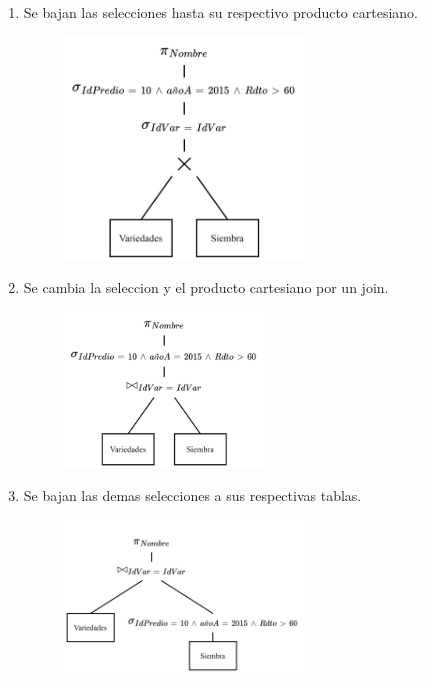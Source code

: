 \documentclass{templateNote}
\begin{document}
\begin{enumerate}
\begin{enumerate}
\begin{enumerate}
            \item Se bajan las selecciones hasta su respectivo producto cartesiano.
            \begin{figure}[H]
                \centering
                \includegraphics[width=0.6\textwidth]{img/E2-Paso3.png}
            \end{figure}

            \newpage
            \item Se cambia la seleccion y el producto cartesiano por un join.
            \begin{figure}[H]
                \centering
                \includegraphics[width=0.5\textwidth]{img/E2-Paso4.png}
            \end{figure}

            \item Se bajan las demas selecciones a sus respectivas tablas.
            \begin{figure}[H]
                \centering
                \includegraphics[width=0.6\textwidth]{img/E2-Paso5.png}
            \end{figure}


\end{enumerate}
\end{enumerate}
\end{enumerate}
\end{document}
